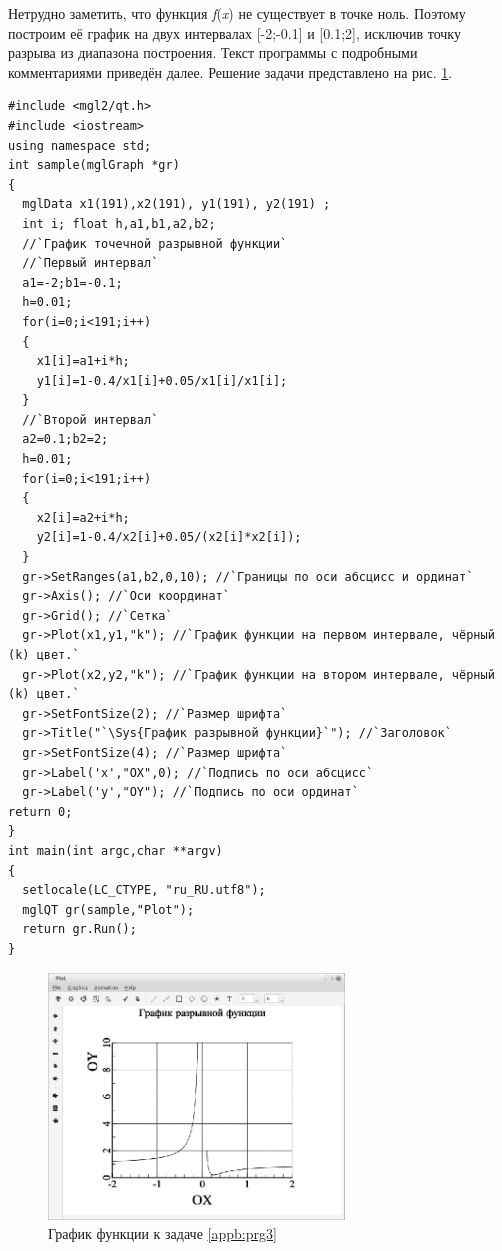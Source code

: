 
Нетрудно заметить, что функция \emph{f}(\emph{x}) не существует в точке ноль. Поэтому
построим её график на двух интервалах [-2;-0.1] и [0.1;2], исключив точку разрыва из диапазона построения. Текст
программы с подробными комментариями приведён далее. Решение задачи представлено на рис. \ref{appb:refDrawing4}.
\begin{lstlisting}
#include <mgl2/qt.h>
#include <iostream>
using namespace std;
int sample(mglGraph *gr)
{  
  mglData x1(191),x2(191), y1(191), y2(191) ;
  int i; float h,a1,b1,a2,b2;
  //`График точечной разрывной функции`
  //`Первый интервал`
  a1=-2;b1=-0.1;
  h=0.01;
  for(i=0;i<191;i++)
  {
    x1[i]=a1+i*h;
    y1[i]=1-0.4/x1[i]+0.05/x1[i]/x1[i];
  }
  //`Второй интервал`
  a2=0.1;b2=2;
  h=0.01;
  for(i=0;i<191;i++)
  {
    x2[i]=a2+i*h;
    y2[i]=1-0.4/x2[i]+0.05/(x2[i]*x2[i]);
  }
  gr->SetRanges(a1,b2,0,10); //`Границы по оси абсцисс и ординат`
  gr->Axis(); //`Оси координат`
  gr->Grid(); //`Сетка`
  gr->Plot(x1,y1,"k"); //`График функции на первом интервале, чёрный (k) цвет.`
  gr->Plot(x2,y2,"k"); //`График функции на втором интервале, чёрный (k) цвет.`
  gr->SetFontSize(2); //`Размер шрифта`
  gr->Title("`\Sys{График разрывной функции}`"); //`Заголовок`
  gr->SetFontSize(4); //`Размер шрифта`
  gr->Label('x',"OX",0); //`Подпись по оси абсцисс`
  gr->Label('y',"OY"); //`Подпись по оси ординат`
return 0;
}
int main(int argc,char **argv)
{
  setlocale(LC_CTYPE, "ru_RU.utf8");
  mglQT gr(sample,"Plot");
  return gr.Run();
}
\end{lstlisting}

\begin{figure}[htb]
\begin{center}
\includegraphics[width=0.7\textwidth]{img/ris_appb_5}
\caption{График функции к задаче \ref{appb:prg3}}
\label{appb:refDrawing4}
\end{center}
\end{figure}

